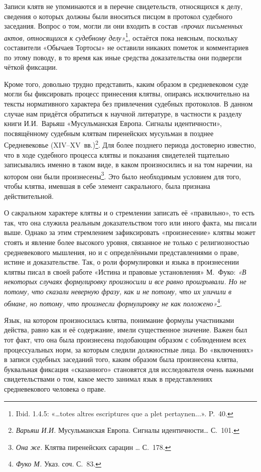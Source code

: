 Записи клятв не упоминаются и в перечне свидетельств, относящихся к делу, сведения о которых должны были вноситься писцом в протокол судебного заседания. Вопрос о том, могли ли они входить в состав \emph{«прочих письменных актов, относящихся к судебному делу»}\footnote{Ibid. 1.4.5: «…totes altres escriptures que a plet pertaynen...». P.~40.}, остаётся пока неясным, поскольку составители «Обычаев Тортосы» не оставили никаких пометок и комментариев по этому поводу, в то время как иные средства доказательства они подвергли чёткой фиксации.

Кроме того, довольно трудно представить, каким образом в средневековом суде могли бы фиксировать процесс принесения клятвы, опираясь исключительно на тексты нормативного характера без привлечения судебных протоколов. В данном случае нам придётся обратиться к научной литературе, в частности к разделу книги И.И.~Варьяш «Мусульманская Европа. Сигналы идентичности», посвящённому судебным клятвам пиренейских мусульман в позднее Средневековье (XIV--XV~вв.)\footnote{\emph{Варьяш}\emph{ }\emph{И}\emph{.}\emph{И}\emph{.} Мусульманская Европа. Сигналы идентичности… С.~101.}. Для более позднего периода достоверно известно, что в ходе судебного процесса клятвы и показания свидетелей тщательно записывались именно в таком виде, в каком произносились и на том наречии, на котором они были произнесены\footnote{\emph{Она же. }Клятва пиренейских сарацин … С.~178.}. Это было необходимым условием для того, чтобы клятва, имевшая в себе элемент сакрального, была признана действительной.

О сакральном характере клятвы и о стремлении записать её «правильно», то есть так, что она служила реальным доказательством того или иного факта, мы писали выше. Однако за этим стремлением зафиксировать «произнесение» клятвы может стоять и явление более высокого уровня, связанное не только с религиозностью средневекового мышления, но и с определёнными представлениями о праве, истине и доказательстве. Так, о роли формулировки и языка в произнесении клятвы писал в своей работе «Истина и правовые установления» М.~Фуко: \emph{«В некоторых случаях }\emph{формулировку произносили и все равно проигрывали. Но не потому, что сказали неверную фразу, как и не потому, что их уличили в обмане, но потому, что произнесли формулировку не как положено»}\footnote{\emph{Фуко М. }Указ. соч. С.~83.}.

Язык, на котором произносилась клятва, понимание формулы участниками действа, равно как и её содержание, имели существенное значение. Важен был тот факт, что она была произнесена подобающим образом с соблюдением всех процессуальных норм, за которым следили должностные лица. Во «включениях» в записи судебных заседаний того, каким образом была произнесена клятва, буквальная фиксация «сказанного» становятся для исследователя очень важными свидетельствами о том, какое место занимал язык в представлениях средневекового человека о праве.

